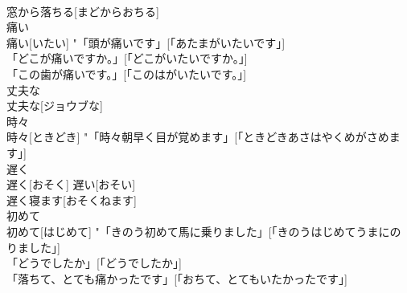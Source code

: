 \documentclass[8pt]{extreport}
\begin{document}
\begin{CJK}{UTF8}{min}
\\	窓から落ちる[まどからおちる] 
\\	痛い	
\\	痛い[いたい]	"「頭が痛いです」[「あたまがいたいです」] 
\\	「どこが痛いですか。」[「どこがいたいですか。」] 
\\	「この歯が痛いです。」[「このはがいたいです。」] 
\\	丈夫な	
\\	丈夫な[ジョウブな]	
\\	時々	
\\	時々[ときどき]	"「時々朝早く目が覚めます」[「ときどきあさはやくめがさめます」] 
\\	遅く	
\\	遅く[おそく]	遅い[おそい] 
\\	遅く寝ます[おそくねます] 
\\	初めて	
\\	初めて[はじめて]	"「きのう初めて馬に乗りました」[「きのうはじめてうまにのりました」] 
\\	「どうでしたか」[「どうでしたか」] 
\\	「落ちて、とても痛かったです」[「おちて、とてもいたかったです」] 
\end{CJK}
\end{document}
